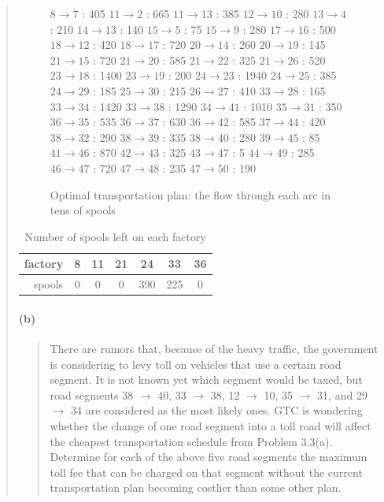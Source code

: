 \begin{quote}
\begin{figure}[H]
\begin{multicols}{5}
$ 8 \rightarrow 7 $ : 405
$ 11 \rightarrow 2 $ : 665
$ 11 \rightarrow 13 $ : 385
$ 12 \rightarrow 10 $ : 280
$ 13 \rightarrow 4 $ : 210
$ 14 \rightarrow 13 $ : 140
$ 15 \rightarrow 5 $ : 75
$ 15 \rightarrow 9 $ : 280
$ 17 \rightarrow 16 $ : 500
$ 18 \rightarrow 12 $ : 420
$ 18 \rightarrow 17 $ : 720
$ 20 \rightarrow 14 $ : 260
$ 20 \rightarrow 19 $ : 145
$ 21 \rightarrow 15 $ : 720
$ 21 \rightarrow 20 $ : 585
$ 21 \rightarrow 22 $ : 325
$ 21 \rightarrow 26 $ : 520
$ 23 \rightarrow 18 $ : 1400
$ 23 \rightarrow 19 $ : 200
$ 24 \rightarrow 23 $ : 1940
$ 24 \rightarrow 25 $ : 385
$ 24 \rightarrow 29 $ : 185
$ 25 \rightarrow 30 $ : 215
$ 26 \rightarrow 27 $ : 410
$ 33 \rightarrow 28 $ : 165
$ 33 \rightarrow 34 $ : 1420
$ 33 \rightarrow 38 $ : 1290
$ 34 \rightarrow 41 $ : 1010
$ 35 \rightarrow 31 $ : 350
$ 36 \rightarrow 35 $ : 535
$ 36 \rightarrow 37 $ : 630
$ 36 \rightarrow 42 $ : 585
$ 37 \rightarrow 44 $ : 420
$ 38 \rightarrow 32 $ : 290
$ 38 \rightarrow 39 $ : 335
$ 38 \rightarrow 40 $ : 280
$ 39 \rightarrow 45 $ : 85
$ 41 \rightarrow 46 $ : 870
$ 42 \rightarrow 43 $ : 325
$ 43 \rightarrow 47 $ : 5
$ 44 \rightarrow 49 $ : 285
$ 46 \rightarrow 47 $ : 720
$ 47 \rightarrow 48 $ : 235
$ 47 \rightarrow 50 $ : 190
\end{multicols}
\caption{Optimal transportation plan: the flow through each arc in tens of spools}
\label{flow3-1a}
\end{figure}

\begin{table}[H]
\centering
\begin{tabular}{|r|c|c|c|c|c|c|}
\hline
factory & 8 & 11 & 21 & 24 & 33 & 36 \\ \hline
spools & 0 & 0 & 0 & 390 & 225 & 0   \\ \hline
\end{tabular}
\caption{Number of spools left on each factory}
\label{spools-left}
\end{table}

\paragraph{(b)}
\begin{quote}
There are rumors that, because of the heavy traffic, the government is considering to levy toll on vehicles that use a certain road segment. It is not known yet which segment would be taxed, but road segments 38 $\rightarrow$ 40, 33 $\rightarrow$ 38, 12 $\rightarrow$ 10, 35 $\rightarrow$ 31, and 29 $\rightarrow$ 34 are considered as the most likely ones.
GTC is wondering whether the change of one road segment into a toll road will affect the cheapest transportation schedule from Problem 3.3(a). Determine for each of the above five road segments the maximum toll fee that can be charged on that segment without the current transportation plan becoming costlier than some other plan.
\end{quote}


\end{quote}
